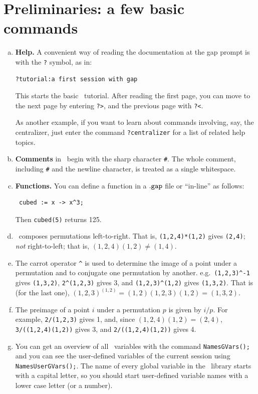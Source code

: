 \section{Preliminaries: a few basic commands}
\begin{enumerate}[a.]
\item {\bf Help.}  A convenient way of reading the documentation at the gap prompt is
 with the {\tt ?} symbol, as in:
{\codesize
\begin{verbatim}
?tutorial:a first session with gap
\end{verbatim}}
\noindent This starts the basic \gap\ tutorial.  After reading the first page,
you can move to the next page by entering {\tt ?>}, and the previous page with
{\tt ?<}.  

As another example, if you want to learn about commands involving, say,
the centralizer, just enter the command
{\tt ?centralizer} for a list of related help topics.

\item {\bf Comments} 
in \gap\ begin with the sharp character {\tt \#}.  The whole comment, including
{\tt \#} and the newline character, is treated as a single whitespace. 

\item {\bf Functions.} You can define a function in a ${\tt .gap}$ file or ``in-line'' as follows:
{\codesize
\begin{verbatim}
 cubed := x -> x^3;
\end{verbatim}}
\noindent Then {\tt cubed(5)} returns 125.

\item 
\gap\ composes permutations left-to-right.  
That is, \verb|(1,2,4)*(1,2)| gives \verb|(2,4)|;\\
\emph{not} right-to-left; that is, $(1,2,4)(1,2) \neq (1,4)$.

\item
The carrot operator \verb|^| is used to determine the image of a point under a
permutation and to conjugate one permutation by another. 
e.g.~\verb|(1,2,3)^-1| gives \verb|(1,3,2)|, \verb|2^(1,2,3)| gives 3, and
\verb|(1,2,3)^(1,2)| gives \verb|(1,3,2)|.
That is (for the last one), $(1,2,3)^{(1,2)} = (1,2)(1,2,3)(1,2) = (1,3,2)$.
\item
The preimage of a point $i$ under a permutation $p$ is given by $i/p$.  For example,
\verb|2/(1,2,3)| gives 1, and, since $(1,2,4)(1,2) = (2,4)$,
\verb|3/((1,2,4)(1,2))| gives 3, and \verb|2/((1,2,4)(1,2))| gives 4.
\item 
You can get an overview of all \gap\ variables with the command {\tt NamesGVars();} and
you can see the user-defined variables of the current session using 
{\tt NamesUserGVars();}.
The name of every global variable in the \gap\ library starts with a capital letter, so you
should start user-defined variable names with a lower case letter (or a number).
\end{enumerate}

